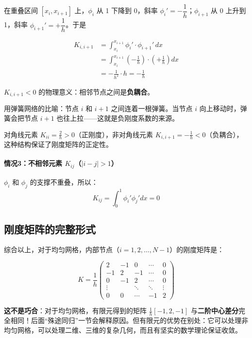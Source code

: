 在重叠区间 $[x_i, x_{i+1}]$ 上，$\phi_i$ 从 1 下降到 0，斜率 $\phi_i' = -\dfrac{1}{h}$；$\phi_{i+1}$ 从 0 上升到 1，斜率 $\phi_{i+1}' = +\dfrac{1}{h}$。于是

\begin{align}
K_{i,i+1} &= \int_{x_i}^{x_{i+1}} \phi_i' \cdot \phi_{i+1}' \, dx \\
&= \int_{x_i}^{x_{i+1}} \left(-\frac{1}{h}\right) \cdot \left(+\frac{1}{h}\right) dx \\
&= -\frac{1}{h^2} \cdot h = \boxed{-\frac{1}{h}}
\end{align}

\begin{physicalmeaning}
$K_{i,i+1} < 0$ 的物理意义：相邻节点之间是\textbf{负耦合}。

用弹簧网络的比喻：节点 $i$ 和 $i+1$ 之间连着一根弹簧。当节点 $i$ 向上移动时，弹簧会把节点 $i+1$ 也往上拉——这就是负刚度系数的来源。

对角线元素 $K_{ii} = \frac{2}{h} > 0$（正刚度），非对角线元素 $K_{i,i+1} = -\frac{1}{h} < 0$（负耦合），这种结构保证了刚度矩阵的正定性。
\end{physicalmeaning}

\paragraph{情况3：不相邻元素 $K_{ij}$（$|i-j| > 1$）}

$\phi_i$ 和 $\phi_j$ 的支撑不重叠，所以：
\[
K_{ij} = \int_0^1 \phi_i' \phi_j' dx = 0
\]

\subsection{刚度矩阵的完整形式}

综合以上，对于均匀网格，内部节点（$i = 1, 2, \ldots, N-1$）的刚度矩阵是：

\begin{equation}
K = \frac{1}{h}
\begin{pmatrix}
2 & -1 & 0 & \cdots & 0 \\
-1 & 2 & -1 & \cdots & 0 \\
0 & -1 & 2 & \cdots & 0 \\
\vdots & & \ddots & \ddots & \vdots \\
0 & 0 & \cdots & -1 & 2
\end{pmatrix}
\end{equation}

\begin{insightbox}
\textbf{这不是巧合}：对于均匀网格，有限元得到的矩阵 $\frac{1}{h}[-1, 2, -1]$ 与\textbf{二阶中心差分}完全相同！后面“殊途同归”一节会解释原因。但有限元的优势在别处：它可以处理非均匀网格，可以处理二维、三维的复杂几何，而且有坚实的数学理论保证收敛。
\end{insightbox}

